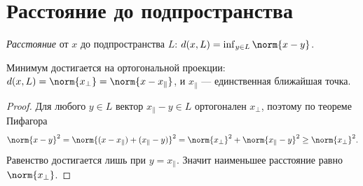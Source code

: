 \section{Расстояние до подпространства}

\begin{definition}
\emph{Расстояние} от $x$ до подпространства $L$: $d(x,L)=\inf_{y\in L}\norm{x-y}$.
\end{definition}

\begin{theorem}
Минимум достигается на ортогональной проекции: $d(x,L)=\norm{x_\perp}=\norm{x-x_\parallel}$, и
$x_\parallel$ — единственная ближайшая точка.
\end{theorem}

\begin{proof}
Для любого $y\in L$ вектор $x_\parallel-y\in L$ ортогонален $x_\perp$, поэтому по теореме Пифагора
\[
  \norm{x-y}^2=\norm{(x-x_\parallel)+(x_\parallel-y)}^2=\norm{x_\perp}^2+\norm{x_\parallel-y}^2
  \ge\norm{x_\perp}^2 .
\]
Равенство достигается лишь при $y=x_\parallel$. Значит наименьшее расстояние равно
$\norm{x_\perp}$.
\end{proof}
